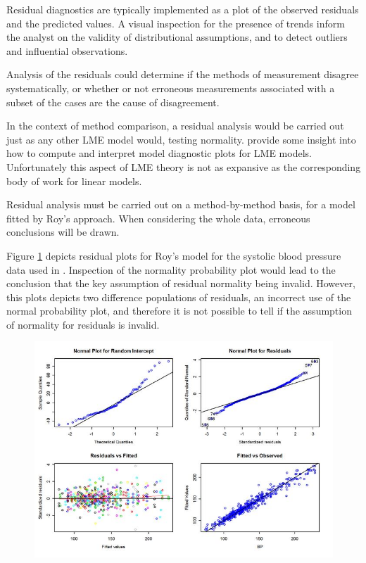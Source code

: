 \documentclass[12pt, a4paper]{report}
\theoremstyle{definition}
\theoremstyle{remark}
\begin{document}

Residual diagnostics are typically implemented as a plot of the observed residuals and the predicted values. A visual inspection for the presence of trends inform the analyst on the validity of distributional assumptions, and to detect outliers and influential observations.



Analysis of the residuals could determine if the methods of measurement disagree systematically, or whether or not erroneous measurements associated with a subset of the cases are the cause of disagreement. 

In the context of method comparison, a residual analysis would be carried out just as any other LME model would, testing normality. \citet{PB} provide some insight into how to compute and interpret model diagnostic plots for LME models. Unfortunately this aspect of LME theory is not as expansive as the corresponding body of work for linear models.
 
 Residual analysis must be carried out on a method-by-method basis, for a model fitted by Roy's approach. When considering the whole data, erroneous conclusions will be drawn.

Figure \ref{fig:ResidPlot} depicts residual plots for Roy's model for the systolic blood pressure data used in \citet{BA99}. Inspection of the normality probability plot would lead to the conclusion that the key assumption of residual normality being invalid. However, this plots depicts two difference populations of residuals, an incorrect use of the normal probability plot, and therefore it is not possible to tell if the assumption of normality for residuals is invalid.

\begin{figure}[h!]
	\centering
	\includegraphics[width=0.9\linewidth]{images/ResidPlot}
	\caption{}
	\label{fig:ResidPlot}
\end{figure}
\end{document}
